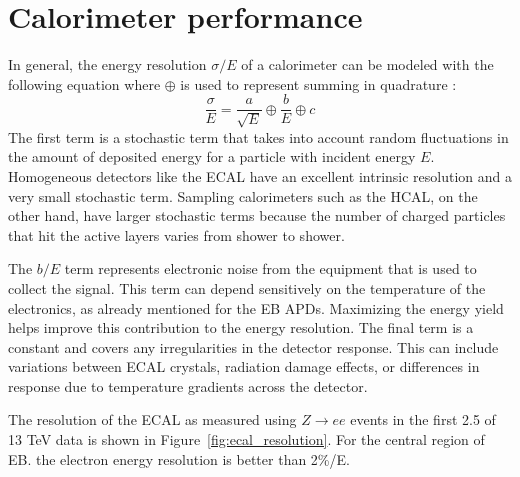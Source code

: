 \section{Calorimeter performance}
In general, the energy resolution $\sigma/E$ of a calorimeter can be modeled with the following equation where $\oplus$ is used to represent summing in quadrature \cite{Calo}:
\begin{equation}
\frac{\sigma}{E} = \frac{a}{\sqrt{E}} \oplus \frac{b}{E}  \oplus c 
\end{equation}
The first term is a stochastic term that takes into account random fluctuations in the amount of deposited energy for a particle with incident energy $E$. Homogeneous detectors like the ECAL have an excellent intrinsic resolution and a very small stochastic term. Sampling calorimeters such as the HCAL, on the other hand, have larger stochastic terms because the number of charged particles that hit the active layers varies from shower to shower.

The $b/E$ term represents electronic noise from the equipment that is used to collect the signal. This term can depend sensitively on the temperature of the electronics, as already mentioned for the EB APDs. Maximizing the energy yield helps improve this contribution to the energy resolution. The final term is a constant and covers any irregularities in the detector response. This can include variations between ECAL crystals, radiation damage effects, or differences in response due to temperature gradients across the detector.

The resolution of the ECAL as measured using $Z\rightarrow ee$ events in the first 2.5 \fbinv of 13 TeV data is shown in Figure~\ref{fig:ecal_resolution}. For the central region of EB. the electron energy resolution is better than 2\%/E. 

